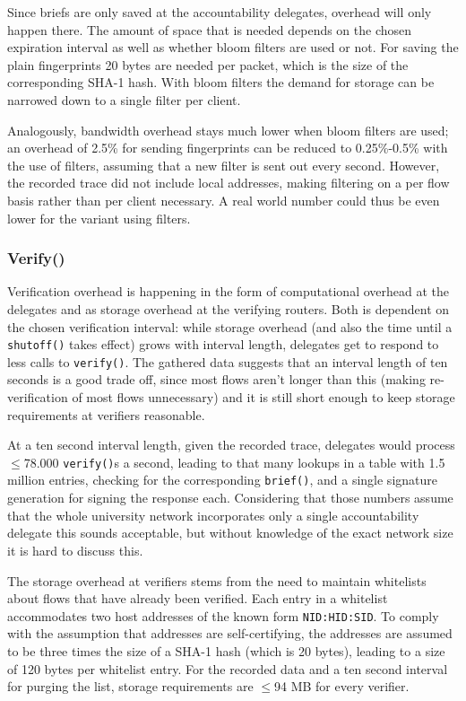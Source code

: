 \documentclass{acm_proc_article-sp}
\begin{document}
Since briefs are only saved at the accountability delegates, overhead will only happen there. The amount of space that is needed depends on the chosen expiration interval as well as whether bloom filters are used or not. For saving the plain fingerprints 20 bytes are needed per packet, which is the size of the corresponding SHA-1 hash. With bloom filters the demand for storage can be narrowed down to a single filter per client.

Analogously, bandwidth overhead stays much lower when bloom filters are used; an overhead of 2.5\% for sending fingerprints can be reduced to 0.25\%-0.5\% with the use of filters, assuming that a new filter is sent out every second. However, the recorded trace did not include local addresses, making filtering on a per flow basis rather than per client necessary. A real world number could thus be even lower for the variant using filters.

\subsubsection{Verify()}
Verification overhead is happening in the form of computational overhead at the delegates and as storage overhead at the verifying routers. Both is dependent on the chosen verification interval: while storage overhead (and also the time until a \texttt{shutoff()} takes effect) grows with interval length, delegates get to respond to less calls to \texttt{verify()}. The gathered data suggests that an interval length of ten seconds is a good trade off, since most flows aren't longer than this (making re-verification of most flows unnecessary) and it is still short enough to keep storage requirements at verifiers reasonable.

At a ten second interval length, given the recorded trace, delegates would process $\le$78.000 \texttt{verify()}s a second, leading to that many lookups in a table with 1.5 million entries, checking for the corresponding \texttt{brief()}, and a single signature generation for signing the response each. Considering that those numbers assume that the whole university network incorporates only a single accountability delegate this sounds acceptable, but without knowledge of the exact network size it is hard to discuss this.

The storage overhead at verifiers stems from the need to maintain whitelists about flows that have already been verified. Each entry in a whitelist accommodates two host addresses of the known form \texttt{NID:HID:SID}. To comply with the assumption that addresses are self-certifying, the addresses are assumed to be three times the size of a SHA-1 hash (which is 20 bytes), leading to a size of 120 bytes per whitelist entry. For the recorded data and a ten second interval for purging the list, storage requirements are $\le$94 MB for every verifier.
\end{document}
